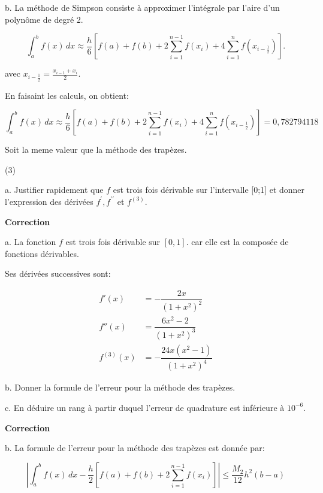 \documentclass{article}
\newcommand{\correction}[0]{
    \vspace{1mm}
    \textbf{Correction}
    \hrulefill
}
\begin{document}
b. La méthode de Simpson consiste à approximer l'intégrale par l'aire d'un polynôme de degré 2.

\begin{equation*}
    \int_a^b f(x) \, dx \approx \frac{h}{6} \left[ f(a) + f(b) + 2 \sum_{i=1}^{n-1} f(x_{i}) + 4 \sum_{i=1}^{n} f(x_{i-\frac12}) \right].
\end{equation*}

avec $x_{i-\frac12} = \frac{x_{i-1} + x_i}{2}$.

En faisaint les calculs, on obtient:

\begin{equation*}
    \int_a^b f(x) \, dx \approx \frac{h}{6} \left[ f(a) + f(b) + 2 \sum_{i=1}^{n-1} f(x_{i}) + 4 \sum_{i=1}^{n} f(x_{i-\frac12}) \right] = 0,782794118
\end{equation*}

Soit la meme valeur que la méthode des trapèzes.


\hrulefill

(3) 

a. Justifier rapidement que $f$ est trois fois dérivable sur l'intervalle [0;1] et donner
l'expression des dérivées $f^\prime,f^{\prime\prime}$ et $f^{(3)}.$

\correction

a. La fonction $f$ est trois fois dérivable sur $[0,1]$. car elle est la composée de fonctions dérivables.


Ses dérivées successives sont:

\begin{align*}
    f'(x) &= -\dfrac{2x}{(1 + x^2)^2} \\
    f''(x) &= \dfrac{6x^2 - 2}{(1 + x^2)^3} \\
    f^{(3)}(x) &= -\dfrac{24x(x^2 - 1)}{(1 + x^2)^4}
\end{align*}


\hrulefill

b. Donner la formule de l'erreur pour la méthode des trapèzes.

c. En déduire un rang à partir duquel l'erreur de quadrature est inférieure à
$10^{-6}.$


\correction

b. La formule de l'erreur pour la méthode des trapèzes est donnée par:

\begin{equation*}
    \left| \int_a^b f(x) \, dx - \frac{h}{2} \left[ f(a) + f(b) + 2 \sum_{i=1}^{n-1} f(x_i) \right] \right| \leq \frac{M_2}{12}h^2(b-a)
\end{equation*}
\end{document}
